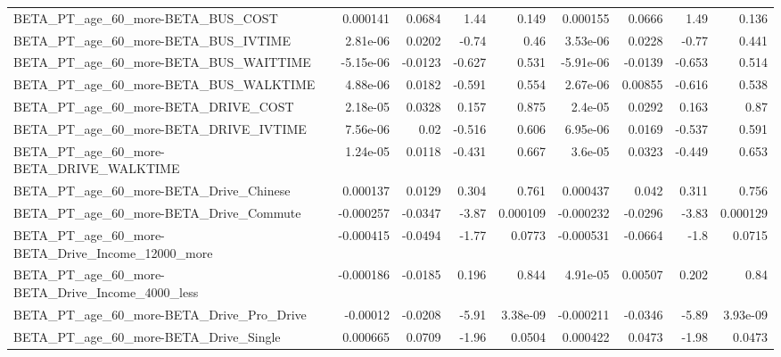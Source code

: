 \begin{tabular}{lrrrrrrrr}
BETA\_PT\_age\_60\_more-BETA\_BUS\_COST                  &    0.000141 &       0.0684 &      1.44 &    0.149 &   0.000155 &      0.0666 &         1.49 &         0.136 \\
BETA\_PT\_age\_60\_more-BETA\_BUS\_IVTIME                &    2.81e-06 &       0.0202 &     -0.74 &     0.46 &   3.53e-06 &      0.0228 &        -0.77 &         0.441 \\
BETA\_PT\_age\_60\_more-BETA\_BUS\_WAITTIME              &   -5.15e-06 &      -0.0123 &    -0.627 &    0.531 &  -5.91e-06 &     -0.0139 &       -0.653 &         0.514 \\
BETA\_PT\_age\_60\_more-BETA\_BUS\_WALKTIME              &    4.88e-06 &       0.0182 &    -0.591 &    0.554 &   2.67e-06 &     0.00855 &       -0.616 &         0.538 \\
BETA\_PT\_age\_60\_more-BETA\_DRIVE\_COST                &    2.18e-05 &       0.0328 &     0.157 &    0.875 &    2.4e-05 &      0.0292 &        0.163 &          0.87 \\
BETA\_PT\_age\_60\_more-BETA\_DRIVE\_IVTIME              &    7.56e-06 &         0.02 &    -0.516 &    0.606 &   6.95e-06 &      0.0169 &       -0.537 &         0.591 \\
BETA\_PT\_age\_60\_more-BETA\_DRIVE\_WALKTIME            &    1.24e-05 &       0.0118 &    -0.431 &    0.667 &    3.6e-05 &      0.0323 &       -0.449 &         0.653 \\
BETA\_PT\_age\_60\_more-BETA\_Drive\_Chinese             &    0.000137 &       0.0129 &     0.304 &    0.761 &   0.000437 &       0.042 &        0.311 &         0.756 \\
BETA\_PT\_age\_60\_more-BETA\_Drive\_Commute             &   -0.000257 &      -0.0347 &     -3.87 & 0.000109 &  -0.000232 &     -0.0296 &        -3.83 &      0.000129 \\
BETA\_PT\_age\_60\_more-BETA\_Drive\_Income\_12000\_more   &   -0.000415 &      -0.0494 &     -1.77 &   0.0773 &  -0.000531 &     -0.0664 &         -1.8 &        0.0715 \\
BETA\_PT\_age\_60\_more-BETA\_Drive\_Income\_4000\_less    &   -0.000186 &      -0.0185 &     0.196 &    0.844 &   4.91e-05 &     0.00507 &        0.202 &          0.84 \\
BETA\_PT\_age\_60\_more-BETA\_Drive\_Pro\_Drive           &    -0.00012 &      -0.0208 &     -5.91 & 3.38e-09 &  -0.000211 &     -0.0346 &        -5.89 &      3.93e-09 \\
BETA\_PT\_age\_60\_more-BETA\_Drive\_Single              &    0.000665 &       0.0709 &     -1.96 &   0.0504 &   0.000422 &      0.0473 &        -1.98 &        0.0473 \\

\end{tabular}
